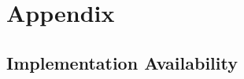 \chapter{Appendix}
\label{apendice1}

\section{Implementation Availability}\label{sec:implementation-availability}
